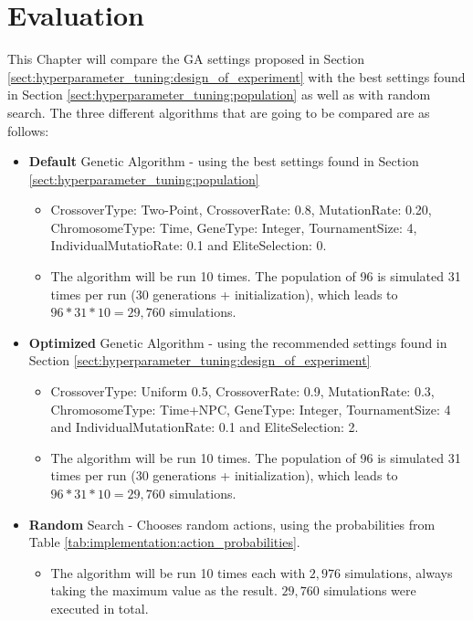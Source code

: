 \chapter{Evaluation}
\label{chap:evaluation}
This Chapter will compare the GA settings proposed in Section \ref{sect:hyperparameter_tuning:design_of_experiment} with the best settings found in Section \ref{sect:hyperparameter_tuning:population} as well as with random search. The three different algorithms that are going to be compared are as follows:
\begin{itemize}
	\item \textbf{Default} Genetic Algorithm - using the best settings found in Section \ref{sect:hyperparameter_tuning:population}
	\begin{itemize}
		\item CrossoverType: Two-Point, CrossoverRate: 0.8, MutationRate: 0.20, ChromosomeType: Time, GeneType: Integer, TournamentSize: 4, IndividualMutatioRate: 0.1 and EliteSelection: 0. 
		\item The algorithm will be run 10 times. The population of 96 is simulated 31 times per run (30 generations + initialization), which leads to $96 * 31 * 10 = 29,760$ simulations.
	\end{itemize}
	\item \textbf{Optimized} Genetic Algorithm - using the recommended settings found in Section \ref{sect:hyperparameter_tuning:design_of_experiment}
	\begin{itemize}
		\item CrossoverType: Uniform 0.5, CrossoverRate: 0.9, MutationRate: 0.3, ChromosomeType: Time+NPC, GeneType: Integer, TournamentSize: 4 and IndividualMutationRate: 0.1 and EliteSelection: 2. 
		\item The algorithm will be run 10 times. The population of 96 is simulated 31 times per run (30 generations + initialization), which leads to $96 * 31 * 10 = 29,760$ simulations.
	\end{itemize}
	\item \textbf{Random} Search - Chooses random actions, using the probabilities from Table \ref{tab:implementation:action_probabilities}. 
	\begin{itemize}
		\item The algorithm will be run 10 times each with $2,976$ simulations, always taking the maximum value as the result. $29,760$ simulations were executed in total.
	\end{itemize}
\end{itemize}

